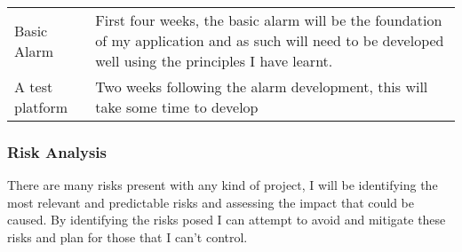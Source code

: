 \begin{longtable}[]{@{}ll@{}}
\begin{minipage}[t]{0.20\columnwidth}
Basic Alarm\strut
\end{minipage} & \begin{minipage}[t]{0.74\columnwidth}\raggedright\strut
First four weeks, the basic alarm will be the foundation of my
application and as such will need to be developed well using the
principles I have learnt.\strut
\end{minipage}\tabularnewline
\begin{minipage}[t]{0.20\columnwidth}\raggedright\strut
A test platform\strut
\end{minipage} & \begin{minipage}[t]{0.74\columnwidth}\raggedright\strut
Two weeks following the alarm development, this will take some time to
develop\strut
\end{minipage}\tabularnewline
\bottomrule
\end{longtable}

\subsubsection{Risk Analysis}\label{risk-analysis}

There are many risks present with any kind of project, I will be
identifying the most relevant and predictable risks and assessing the
impact that could be caused. By identifying the risks posed I can
attempt to avoid and mitigate these risks and plan for those that I
can't control.

